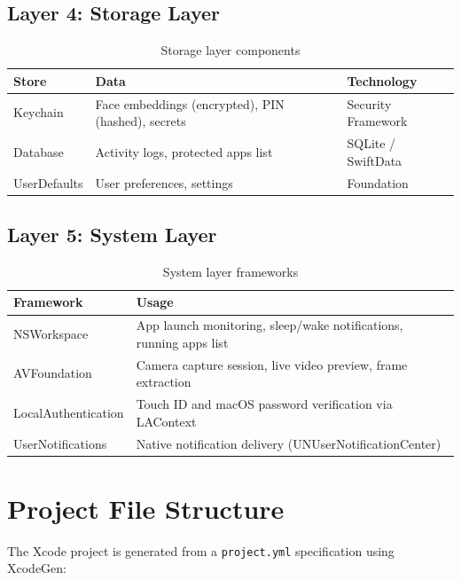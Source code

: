 \documentclass[12pt,a4paper]{report}
\begin{document}
\subsection{Layer 4: Storage Layer}
\begin{table}[H]
\centering
\begin{tabularx}{\textwidth}{lXl}
\toprule
\textbf{Store} & \textbf{Data} & \textbf{Technology} \\
\midrule
Keychain & Face embeddings (encrypted), PIN (hashed), secrets & Security Framework \\
Database & Activity logs, protected apps list & SQLite / SwiftData \\
UserDefaults & User preferences, settings & Foundation \\
\bottomrule
\end{tabularx}
\caption{Storage layer components}
\end{table}

\subsection{Layer 5: System Layer}
\begin{table}[H]
\centering
\begin{tabularx}{\textwidth}{lX}
\toprule
\textbf{Framework} & \textbf{Usage} \\
\midrule
NSWorkspace & App launch monitoring, sleep/wake notifications, running apps list \\
AVFoundation & Camera capture session, live video preview, frame extraction \\
LocalAuthentication & Touch ID and macOS password verification via LAContext \\
UserNotifications & Native notification delivery (UNUserNotificationCenter) \\
\bottomrule
\end{tabularx}
\caption{System layer frameworks}
\end{table}

\section{Project File Structure}
The Xcode project is generated from a \texttt{project.yml} specification using XcodeGen:
\end{document}
